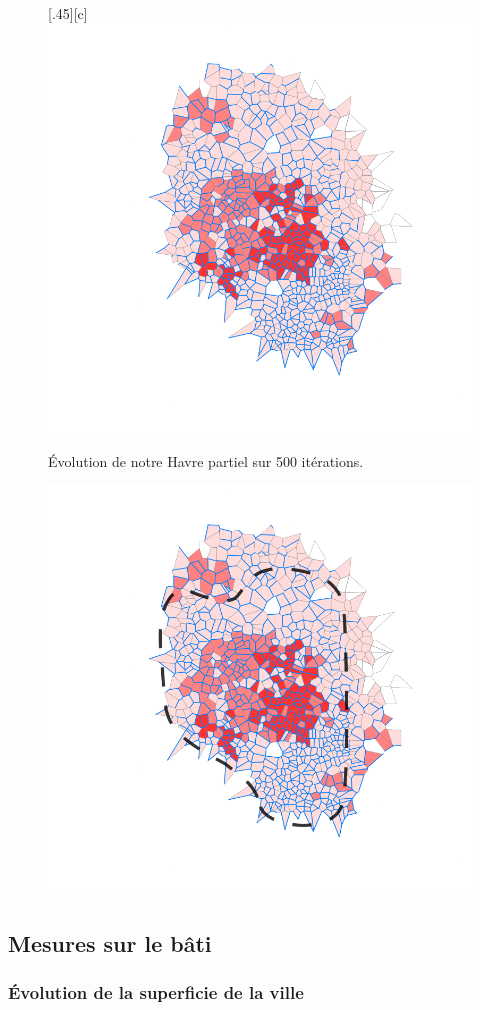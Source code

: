 \documentclass[12pt]{article}
\begin{document}
\begin{figure}[H]
  [.45\linewidth][c]{
    \includegraphics[width=.45\linewidth]{images/lh_500.png}
  }
  \caption{Évolution de notre Havre partiel sur 500 itérations.}
  \label{fig:le_havre_demo}
\end{figure}

\begin{figure}[H]
  \centering
  \includegraphics[width=.8\linewidth]{images/lh_500_comparison.png}
  \caption{}
\end{figure}

\subsection{Mesures sur le bâti}

\subsubsection{Évolution de la superficie de la ville}
\end{document}
